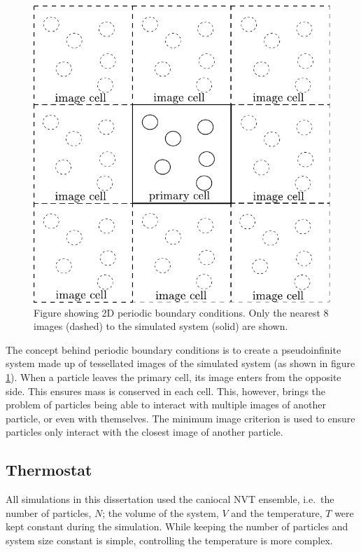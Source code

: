 \message{ !name(main.tex)}\documentclass[12pt]{UoAthesis}
\begin{document}
\begin{figure}[htp] 
  \begin{center}
    \includegraphics[clip, scale = 0.8]{figures/PBC} 
    \caption{\label{fig:PBC} Figure showing 2D periodic boundary
      conditions. Only the nearest 8 images (dashed) to the simulated
      system (solid) are shown.}
  \end{center}
\end{figure}

The concept behind periodic boundary conditions is to create a
pseudoinfinite system made up of tessellated images of the simulated
system (as shown in figure \ref{fig:PBC}).  When a particle leaves the
primary cell, its image enters from the opposite side.  This ensures
mass is conserved in each cell.  This, however, brings the problem of
particles being able to interact with multiple images of another
particle, or even with themselves.  The minimum image criterion is
used to ensure particles only interact with the closest image of
another particle.


\subsection{Thermostat}

All simulations in this dissertation used the caniocal NVT ensemble,
i.e.\ the number of particles, $N$; the volume of the system, $V$ and
the temperature, $T$ were kept constant during the simulation.  While
keeping the number of particles and system size constant is simple,
controlling the temperature is more complex.  
\end{document}
